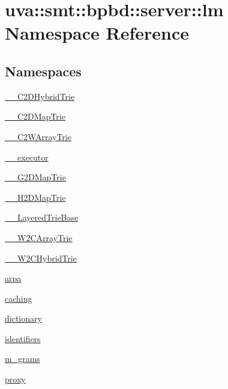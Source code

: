 \hypertarget{namespaceuva_1_1smt_1_1bpbd_1_1server_1_1lm}{}\section{uva\+:\+:smt\+:\+:bpbd\+:\+:server\+:\+:lm Namespace Reference}
\label{namespaceuva_1_1smt_1_1bpbd_1_1server_1_1lm}
\subsection*{Namespaces}
\begin{DoxyCompactItemize}
\item 
 \hyperlink{namespaceuva_1_1smt_1_1bpbd_1_1server_1_1lm_1_1_____c2_d_hybrid_trie}{\+\_\+\+\_\+\+C2\+D\+Hybrid\+Trie}
\item 
 \hyperlink{namespaceuva_1_1smt_1_1bpbd_1_1server_1_1lm_1_1_____c2_d_map_trie}{\+\_\+\+\_\+\+C2\+D\+Map\+Trie}
\item 
 \hyperlink{namespaceuva_1_1smt_1_1bpbd_1_1server_1_1lm_1_1_____c2_w_array_trie}{\+\_\+\+\_\+\+C2\+W\+Array\+Trie}
\item 
 \hyperlink{namespaceuva_1_1smt_1_1bpbd_1_1server_1_1lm_1_1____executor}{\+\_\+\+\_\+executor}
\item 
 \hyperlink{namespaceuva_1_1smt_1_1bpbd_1_1server_1_1lm_1_1_____g2_d_map_trie}{\+\_\+\+\_\+\+G2\+D\+Map\+Trie}
\item 
 \hyperlink{namespaceuva_1_1smt_1_1bpbd_1_1server_1_1lm_1_1_____h2_d_map_trie}{\+\_\+\+\_\+\+H2\+D\+Map\+Trie}
\item 
 \hyperlink{namespaceuva_1_1smt_1_1bpbd_1_1server_1_1lm_1_1_____layered_trie_base}{\+\_\+\+\_\+\+Layered\+Trie\+Base}
\item 
 \hyperlink{namespaceuva_1_1smt_1_1bpbd_1_1server_1_1lm_1_1_____w2_c_array_trie}{\+\_\+\+\_\+\+W2\+C\+Array\+Trie}
\item 
 \hyperlink{namespaceuva_1_1smt_1_1bpbd_1_1server_1_1lm_1_1_____w2_c_hybrid_trie}{\+\_\+\+\_\+\+W2\+C\+Hybrid\+Trie}
\item 
 \hyperlink{namespaceuva_1_1smt_1_1bpbd_1_1server_1_1lm_1_1arpa}{arpa}
\item 
 \hyperlink{namespaceuva_1_1smt_1_1bpbd_1_1server_1_1lm_1_1caching}{caching}
\item 
 \hyperlink{namespaceuva_1_1smt_1_1bpbd_1_1server_1_1lm_1_1dictionary}{dictionary}
\item 
 \hyperlink{namespaceuva_1_1smt_1_1bpbd_1_1server_1_1lm_1_1identifiers}{identifiers}
\item 
 \hyperlink{namespaceuva_1_1smt_1_1bpbd_1_1server_1_1lm_1_1m__grams}{m\+\_\+grams}
\item 
 \hyperlink{namespaceuva_1_1smt_1_1bpbd_1_1server_1_1lm_1_1proxy}{proxy}
\end{DoxyCompactItemize}
